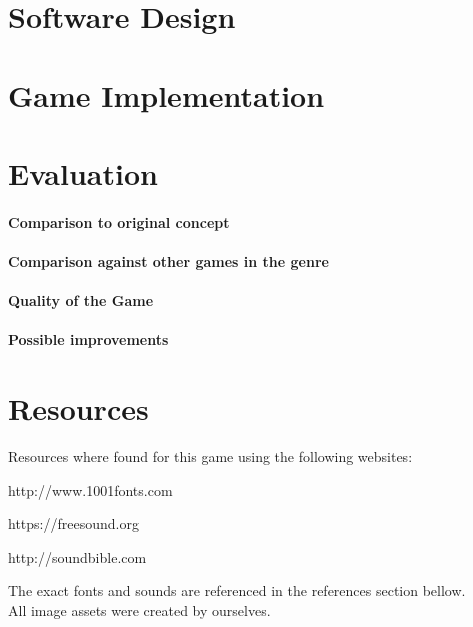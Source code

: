 \documentclass[10pt, a4paper]{article}
\begin{document}
	\section{Software Design}
	
	\section{Game Implementation}
	
	\section{Evaluation}
	\paragraph{Comparison to original concept}
	\paragraph{Comparison against other games in the genre}
	\paragraph{Quality of the Game}
	\paragraph{Possible improvements}
	
	\section{Resources}
	Resources where found for this game using the following websites:
	
	http://www.1001fonts.com
	
	https://freesound.org
	
	http://soundbible.com
	
	The exact fonts and sounds are referenced in the references section bellow.\\
	
	All image assets were created by ourselves.
	
\end{document}
